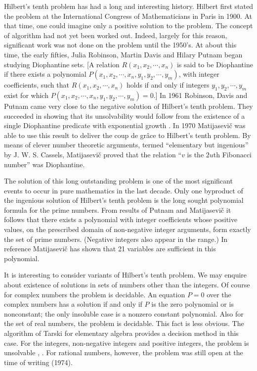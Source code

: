 \documentclass[11pt]{article}
\newcommand{\origpage}[1]{\marginnote{\footnotesize\textbf{[#1]}}}
\begin{document}
Hilbert's tenth problem has had a long and interesting history. Hilbert first stated the problem at the International Congress of Mathematicians in Paris in 1900. At that time, one could imagine only a positive solution to the problem. The concept of algorithm had not yet been worked out. Indeed, largely for this reason, significant work was not done on the problem until the 1950's. At about this time, the early fifties, Julia Robinson, Martin Davis and Hilary Putnam began studying Diophantine sets. [A relation $R\left(x_{1}, x_{2}, \cdots, x_{n}\right)$ is said to be Diophantine if there exists a polynomial $P\left(x_{1}, x_{2}, \cdots, x_{n}, y_{1}, y_{2}, \cdots, y_{m}\right)$, with integer coefficients, such that $R\left(x_{1}, x_{2}, \cdots, x_{n}\right)$ holds if and only if integers $y_{1}, y_{2}, \cdots, y_{m}$ exist for which $P\left(x_{1}, x_{2}, \cdots, x_{n}, y_{1}, y_{2}, \cdots, y_{m}\right)=0$.] In 1961 Robinson, Davis and Putnam came very close to the negative solution of Hilbert's tenth problem. They succeeded in showing that its unsolvability would follow from the existence of a single Diophantine predicate with exponential growth \cite{r10}. In 1970 Matijasevič was able to use this result to deliver the coup de grâce to Hilbert's tenth problem. \origpage{728}By means of clever number theoretic arguments, termed ``elementary but ingenious'' by J. W. S. Cassels, Matijasevič proved that the relation ``$v$ is the $2u$th Fibonacci number'' was Diophantine.

The solution of this long outstanding problem is one of the most significant events to occur in pure mathematics in the last decade. Only one byproduct of the ingenious solution of Hilbert's tenth problem is the long sought polynomial formula for the prime numbers. From results of Putnam \cite{r29} and Matijasevič \cite{r22} \cite{r23} it follows that there exists a polynomial with integer coefficients whose positive values, on the prescribed domain of non-negative integer arguments, form exactly the set of prime numbers. (Negative integers also appear in the range.) In reference \cite{r24} Matijasevič has shown that 21 variables are sufficient in this polynomial.

It is interesting to consider variants of Hilbert's tenth problem. We may enquire about existence of solutions in sets of numbers other than the integers. Of course for complex numbers the problem is decidable. An equation $P=0$ over the complex numbers has a solution if and only if $P$ is the zero polynomial or is nonconstant; the only insoluble case is a nonzero constant polynomial. Also for the set of real numbers, the problem is decidable. This fact is less obvious. The algorithm of Tarski for elementary algebra \cite{r41} provides a decision method in this case. For the integers, non-negative integers and positive integers, the problem is unsolvable \cite{r23}, \cite{r9}. For rational numbers, however, the problem was still open at the time of writing (1974).
\end{document}
